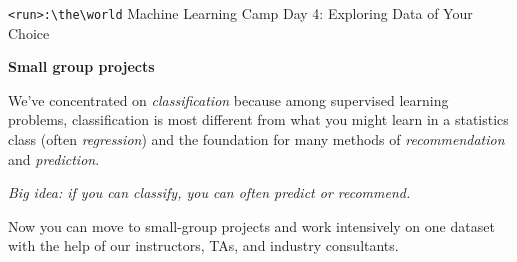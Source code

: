 \documentclass[10pt]{article}
\newcommand{\code}[1]{\colorbox{light-gray}{\texttt{#1}}}
\newcommand{\headerclass}{\code{<run>:\textbackslash the\textbackslash world} Machine Learning Camp}
\newcommand{\headersection}{Day 4: Exploring Data of Your Choice}
\newcommand{\headertitle}{Small group projects}
\begin{document}
\headerclass\xspace {} \headersection\\
\begin{center}{ \large \textbf{\headertitle} }\end{center}

We've concentrated on \textit{classification} because among supervised learning problems, classification is most different from what you might learn in a statistics class (often \textit{regression}) and the foundation for many methods of \textit{recommendation} and \textit{prediction}.

	\begin{center}
\textit{Big idea: if you can classify, you can often predict or recommend.}
\end{center}

Now you can move to small-group projects and work intensively on one dataset with the help of our instructors, TAs, and industry consultants.

\bigskip
\end{document}
